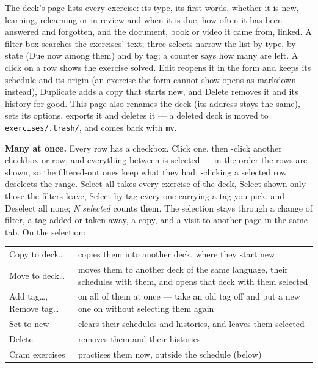 \documentclass[11pt,oneside]{report}
\newcommand{\file}[1]{\texttt{#1}}
\newcommand{\key}[1]{\textsf{\small\fbox{#1}}}
\newcommand{\menu}[1]{\textsf{#1}}
\begin{document}
The deck's page lists every exercise: its type, its first words, whether it
is new, learning, relearning or in review and when it is due, how often it
has been answered and forgotten, and the document, book or video it came
from, linked. A filter box searches the exercises' text; three selects narrow
the list by type, by state (\menu{Due now} among them) and by tag; a counter
says how many are left. A click on a row shows the exercise solved.
\menu{Edit} reopens it in the form and keeps its schedule and its origin (an
exercise the form cannot show opens as markdown instead), \menu{Duplicate}
adds a copy that starts new, and \menu{Delete} removes it and its history for
good. This page also renames the deck (its address stays the same), sets
its options, exports it and deletes it --- a deleted deck is moved to
\file{exercises/.trash/}, and comes back with \texttt{mv}.

\textbf{Many at once.} Every row has a checkbox. Click one, then
\key{Shift}-click another checkbox or row, and everything between is selected
--- in the order the rows are shown, so the filtered-out ones keep what they
had; \key{Shift}-clicking a selected row deselects the range. \menu{Select
all} takes every exercise of the deck, \menu{Select shown} only those the
filters leave, \menu{Select by tag} every one carrying a tag you pick, and
\menu{Deselect all} none; \emph{N selected} counts them. The selection stays
through a change of filter, a tag added or taken away, a copy, and a visit to
another page in the same tab. On the selection:

\begin{center}
\small
\begin{longtable}{@{}>{\raggedright\arraybackslash}p{}>{\raggedright\arraybackslash}p{}@{}}
\toprule
\menu{Copy to deck\ldots} & copies them into another deck, where they start
  new \\
\addlinespace
\menu{Move to deck\ldots} & moves them to another deck of the same language,
  their schedules with them, and opens that deck with them selected \\
\addlinespace
\menu{Add tag\ldots}, \menu{Remove tag\ldots} & on all of them at once ---
  take an old tag off and put a new one on without selecting them again \\
\addlinespace
\menu{Set to new} & clears their schedules and histories, and leaves them
  selected \\
\addlinespace
\menu{Delete} & removes them and their histories \\
\addlinespace
\menu{Cram exercises} & practises them now, outside the schedule (below) \\
\bottomrule
\end{longtable}
\end{center}
\end{document}
